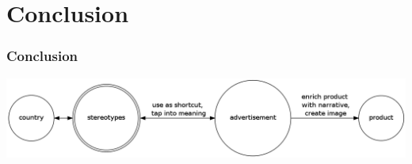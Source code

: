 \documentclass{beamer}
\begin{document}
\section{Conclusion}

\begin{frame}
 \frametitle{Conclusion}
 \includegraphics[scale=.25]{concepts.png}
\end{frame}

\end{document}
